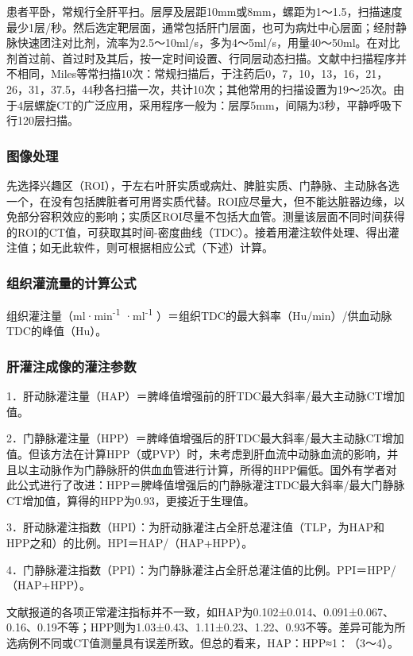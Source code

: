 患者平卧，常规行全肝平扫。层厚及层距10mm或8mm，螺距为1～1.5，扫描速度最少1层/秒。然后选定靶层面，通常包括肝门层面，也可为病灶中心层面；经肘静脉快速团注对比剂，流率为2.5～10ml/s，多为4～5ml/s，用量40～50ml。在对比剂首过前、首过时及其后，按一定时间设置、行同层动态扫描。文献中扫描程序并不相同，Miles等常扫描10次：常规扫描后，于注药后0，7，10，13，16，21，26，31，37.5，44秒各扫描一次，共计10次；其他常用的扫描设置为19～25次。由于4层螺旋CT的广泛应用，采用程序一般为：层厚5mm，间隔为3秒，平静呼吸下行120层扫描。

\subsubsection{图像处理}

先选择兴趣区（ROI），于左右叶肝实质或病灶、脾脏实质、门静脉、主动脉各选一个，在没有包括脾脏者可用肾实质代替。ROI应尽量大，但不能达脏器边缘，以免部分容积效应的影响；实质区ROI尽量不包括大血管。测量该层面不同时间获得的ROI的CT值，可获取其时间-密度曲线（TDC）。接着用灌注软件处理、得出灌注值；如无此软件，则可根据相应公式（下述）计算。

\subsubsection{组织灌流量的计算公式}

组织灌注量（ml·min\textsuperscript{-1} ·ml\textsuperscript{-1}
）＝组织TDC的最大斜率（Hu/min）/供血动脉TDC的峰值（Hu）。

\subsubsection{肝灌注成像的灌注参数}

1．肝动脉灌注量（HAP）＝脾峰值增强前的肝TDC最大斜率/最大主动脉CT增加值。

2．门静脉灌注量（HPP）＝脾峰值增强后的肝TDC最大斜率/最大主动脉CT增加值。但该方法在计算HPP（或PVP）时，未考虑到肝血流中动脉血流的影响，并且以主动脉作为门静脉肝的供血血管进行计算，所得的HPP偏低。国外有学者对此公式进行了改进：HPP＝脾峰值增强后的门静脉灌注TDC最大斜率/最大门静脉CT增加值，算得的HPP为0.93，更接近于生理值。

3．肝动脉灌注指数（HPI）：为肝动脉灌注占全肝总灌注值（TLP，为HAP和HPP之和）的比例。HPI＝HAP/（HAP+HPP）。

4．门静脉灌注指数（PPI）：为门静脉灌注占全肝总灌注值的比例。PPI＝HPP/（HAP+HPP）。

文献报道的各项正常灌注指标并不一致，如HAP为0.102±0.014、0.091±0.067、0.16、0.19不等；HPP则为1.03±0.43、1.11±0.23、1.22、0.93不等。差异可能为所选病例不同或CT值测量具有误差所致。但总的看来，HAP：HPP≈1∶（3～4）。

